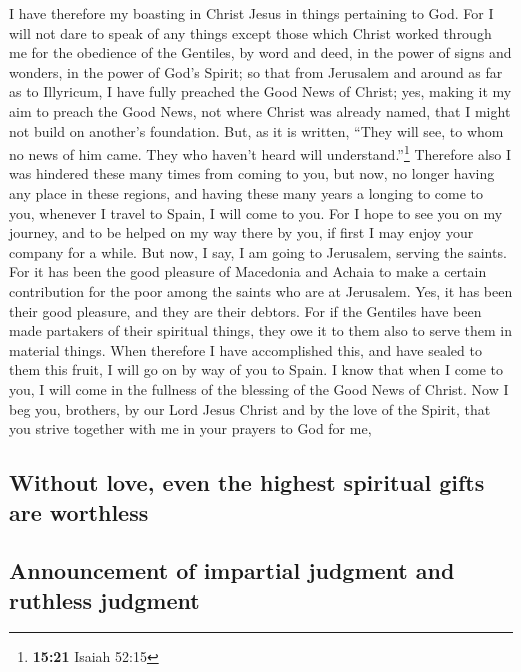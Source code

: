 I have therefore my boasting in Christ Jesus in things pertaining to
God.  For I will not dare to speak of any things except
those which Christ worked through me for the obedience of the Gentiles,
by word and deed,  in the power of signs and wonders, in
the power of God's Spirit; so that from Jerusalem and around as far as
to Illyricum, I have fully preached the Good News of Christ;
 yes, making it my aim to preach the Good News, not where
Christ was already named, that I might not build on another's
foundation.  But, as it is written, ``They will see, to
whom no news of him came. They who haven't heard will
understand.''\footnote{\textbf{15:21} Isaiah 52:15} 
Therefore also I was hindered these many times from coming to you,
 but now, no longer having any place in these regions,
and having these many years a longing to come to you, 
whenever I travel to Spain, I will come to you. For I hope to see you on
my journey, and to be helped on my way there by you, if first I may
enjoy your company for a while.  But now, I say, I am
going to Jerusalem, serving the saints.  For it has been
the good pleasure of Macedonia and Achaia to make a certain contribution
for the poor among the saints who are at Jerusalem.  Yes,
it has been their good pleasure, and they are their debtors. For if the
Gentiles have been made partakers of their spiritual things, they owe it
to them also to serve them in material things.  When
therefore I have accomplished this, and have sealed to them this fruit,
I will go on by way of you to Spain.  I know that when I
come to you, I will come in the fullness of the blessing of the Good
News of Christ.  Now I beg you, brothers, by our Lord
Jesus Christ and by the love of the Spirit, that you strive together
with me in your prayers to God for me,

\hypertarget{without-love-even-the-highest-spiritual-gifts-are-worthless}{%
\subsection{Without love, even the highest spiritual gifts are
worthless}\label{without-love-even-the-highest-spiritual-gifts-are-worthless}}

\hypertarget{announcement-of-impartial-judgment-and-ruthless-judgment}{%
\subsection{Announcement of impartial judgment and ruthless
judgment}\label{announcement-of-impartial-judgment-and-ruthless-judgment}}

